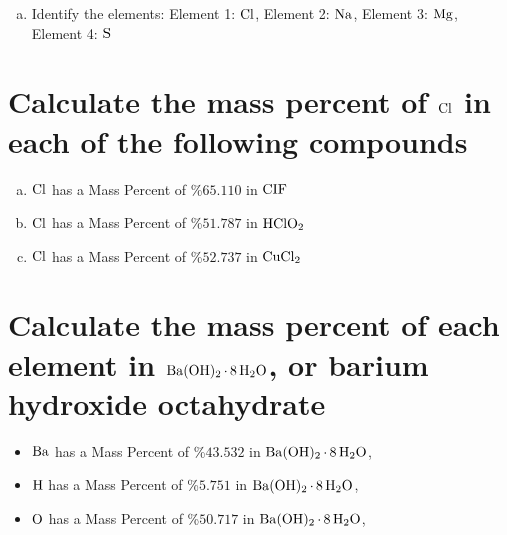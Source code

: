 \documentclass{scrartcl}
\begin{document}
\begin{enumerate}[(a)]
\item Identify the elements: Element 1: \(\ce{Cl}\), Element 2: \(\ce{Na}\), Element 3: \(\ce{Mg}\), Element 4: \(\ce{S}\)
\end{enumerate}

\section{Calculate the mass percent of \(\ce{Cl}\) in each of the following compounds}
\label{sec:orgdb26462}
\begin{enumerate}[(a)]
\item \(\ce{Cl}\)  has a Mass Percent of \%\(65.110\) in \(\ce{CIF}\)
\item \(\ce{Cl}\)  has a Mass Percent of \%\(51.787\) in \(\ce{HClO2}\)
\item \(\ce{Cl}\)  has a Mass Percent of \%\(52.737\) in \(\ce{CuCl2}\)
\end{enumerate}

\section{Calculate the mass percent of each element in \(\ce{Ba(OH)2*8H2O}\), or barium hydroxide octahydrate}
\label{sec:org644f74f}
\begin{itemize}
\item \(\ce{Ba}\)  has a Mass Percent of \%\(43.532\) in \(\ce{Ba(OH)2*8H2O}\),
\item \(\ce{H}\)  has a Mass Percent of \%\(5.751\) in \(\ce{Ba(OH)2*8H2O}\),
\item \(\ce{O}\)  has a Mass Percent of \%\(50.717\) in \(\ce{Ba(OH)2*8H2O}\),
\end{itemize}
\end{document}
